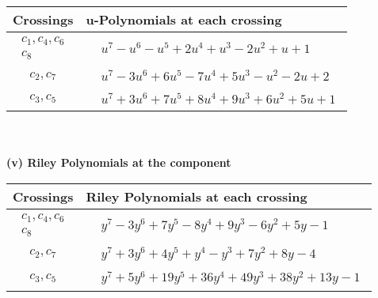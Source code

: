 \documentclass[1p]{elsarticle_modified}
\theoremstyle{definition}
\begin{document}
\begin{tabular}{m{50pt}|m{274pt}}
Crossings & \hspace{64pt}u-Polynomials at each crossing \\
\hline $$\begin{aligned}c_{1},c_{4},c_{6}\\c_{8}\end{aligned}$$&$\begin{aligned}
&u^7- u^6- u^5+2 u^4+u^3-2 u^2+u+1
\end{aligned}$\\
\hline $$\begin{aligned}c_{2},c_{7}\end{aligned}$$&$\begin{aligned}
&u^7-3 u^6+6 u^5-7 u^4+5 u^3- u^2-2 u+2
\end{aligned}$\\
\hline $$\begin{aligned}c_{3},c_{5}\end{aligned}$$&$\begin{aligned}
&u^7+3 u^6+7 u^5+8 u^4+9 u^3+6 u^2+5 u+1
\end{aligned}$\\
\hline
\end{tabular}\\~\\
\newpage\renewcommand{\arraystretch}{1}
\flushleft \textbf{(v) Riley Polynomials at the component}\newline \\
\begin{tabular}{m{50pt}|m{274pt}}
Crossings & \hspace{64pt}Riley Polynomials at each crossing \\
\hline $$\begin{aligned}c_{1},c_{4},c_{6}\\c_{8}\end{aligned}$$&$\begin{aligned}
&y^7-3 y^6+7 y^5-8 y^4+9 y^3-6 y^2+5 y-1
\end{aligned}$\\
\hline $$\begin{aligned}c_{2},c_{7}\end{aligned}$$&$\begin{aligned}
&y^7+3 y^6+4 y^5+y^4- y^3+7 y^2+8 y-4
\end{aligned}$\\
\hline $$\begin{aligned}c_{3},c_{5}\end{aligned}$$&$\begin{aligned}
&y^7+5 y^6+19 y^5+36 y^4+49 y^3+38 y^2+13 y-1
\end{aligned}$\\
\hline
\end{tabular}\\~\\
\end{document}

